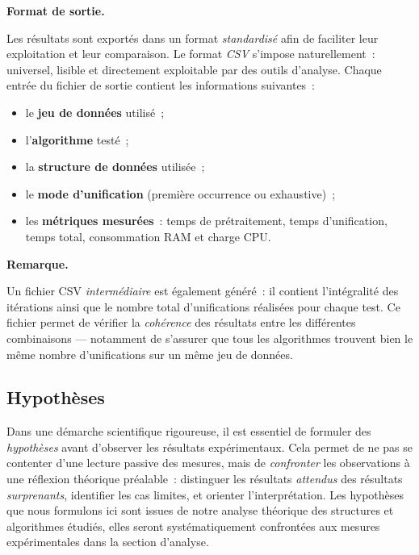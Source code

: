 \documentclass[11pt]{article}
\newenvironment{paraph}[1]{%
  \medskip
  \noindent\textbf{#1.}\quad

  \vspace{0.2cm}
}{%
  \medskip
}
\newenvironment{remarque}{%
    \begin{mdframed}[
        linecolor=sectioncolor!40,
        linewidth=0.8pt,
        backgroundcolor=sectioncolor!5,
        innerleftmargin=10pt,
        innerrightmargin=10pt,
        innertopmargin=6pt,
        innerbottommargin=6pt,
        skipabove=8pt,
        skipbelow=8pt
    ]
    \noindent\textbf{\small\color{sectioncolor}Remarque.}\enspace\small\itshape
}{%
    \end{mdframed}
}
\begin{document}
\begin{paraph}{Format de sortie}
    Les résultats sont exportés dans un format \textit{standardisé} 
    afin de faciliter leur exploitation et leur comparaison. Le format 
    \textit{CSV} s'impose naturellement~: universel, lisible et 
    directement exploitable par des outils d'analyse. Chaque entrée 
    du fichier de sortie contient les informations suivantes~:

    \begin{itemize}
        \item le \textbf{jeu de données} utilisé~;
        \item l'\textbf{algorithme} testé~;
        \item la \textbf{structure de données} utilisée~;
        \item le \textbf{mode d'unification} (première occurrence ou 
        exhaustive)~;
        \item les \textbf{métriques mesurées}~: temps de prétraitement, 
        temps d'unification, temps total, consommation RAM et charge CPU.
    \end{itemize}

    \begin{remarque}
        Un fichier CSV \emph{intermédiaire} est également généré~: 
        il contient l'intégralité des itérations ainsi que le nombre 
        total d'unifications réalisées pour chaque test. Ce fichier 
        permet de vérifier la \emph{cohérence} des résultats entre 
        les différentes combinaisons --- notamment de s'assurer que 
        tous les algorithmes trouvent bien le même nombre d'unifications 
        sur un même jeu de données.
    \end{remarque}
\end{paraph}

\subsection{Hypothèses}
Dans une démarche scientifique rigoureuse, il est essentiel de 
formuler des \textit{hypothèses} avant d'observer les résultats 
expérimentaux. Cela permet de ne pas se contenter d'une lecture 
passive des mesures, mais de \textit{confronter} les observations 
à une réflexion théorique préalable~: distinguer les résultats 
\textit{attendus} des résultats \textit{surprenants}, identifier 
les cas limites, et orienter l'interprétation. Les hypothèses 
que nous formulons ici sont issues de notre analyse théorique 
des structures et algorithmes étudiés, elles seront 
systématiquement confrontées aux mesures expérimentales dans 
la section d'analyse.
\end{document}
